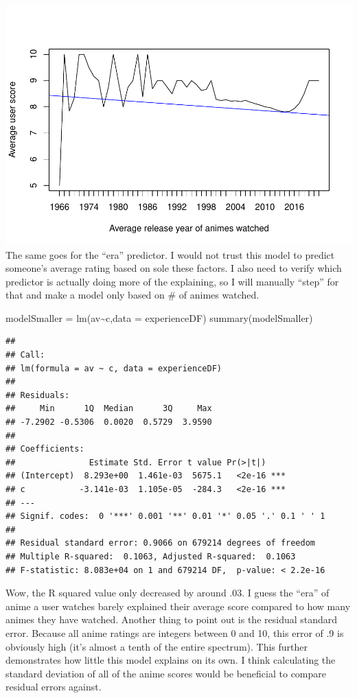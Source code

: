 \documentclass[
]{article}
\newenvironment{Shaded}{\begin{snugshade}}{\end{snugshade}}
\newcommand{\AttributeTok}[1]{\textcolor[rgb]{0.77,0.63,0.00}{#1}}
\newcommand{\FunctionTok}[1]{\textcolor[rgb]{0.00,0.00,0.00}{#1}}
\newcommand{\NormalTok}[1]{#1}
\newcommand{\OtherTok}[1]{\textcolor[rgb]{0.56,0.35,0.01}{#1}}
\newcommand{\SpecialCharTok}[1]{\textcolor[rgb]{0.00,0.00,0.00}{#1}}
\begin{document}
\includegraphics{R_analysis_files/figure-latex/unnamed-chunk-16-1.pdf}
The same goes for the ``era'' predictor. I would not trust this model to
predict someone's average rating based on sole these factors. I also
need to verify which predictor is actually doing more of the explaining,
so I will manually ``step'' for that and make a model only based on \#
of animes watched.

\begin{Shaded}
\begin{Highlighting}[]
\NormalTok{modelSmaller }\OtherTok{=} \FunctionTok{lm}\NormalTok{(av}\SpecialCharTok{\textasciitilde{}}\NormalTok{c,}\AttributeTok{data =}\NormalTok{ experienceDF)}
\FunctionTok{summary}\NormalTok{(modelSmaller)}
\end{Highlighting}
\end{Shaded}

\begin{verbatim}
## 
## Call:
## lm(formula = av ~ c, data = experienceDF)
## 
## Residuals:
##     Min      1Q  Median      3Q     Max 
## -7.2902 -0.5306  0.0020  0.5729  3.9590 
## 
## Coefficients:
##               Estimate Std. Error t value Pr(>|t|)    
## (Intercept)  8.293e+00  1.461e-03  5675.1   <2e-16 ***
## c           -3.141e-03  1.105e-05  -284.3   <2e-16 ***
## ---
## Signif. codes:  0 '***' 0.001 '**' 0.01 '*' 0.05 '.' 0.1 ' ' 1
## 
## Residual standard error: 0.9066 on 679214 degrees of freedom
## Multiple R-squared:  0.1063, Adjusted R-squared:  0.1063 
## F-statistic: 8.083e+04 on 1 and 679214 DF,  p-value: < 2.2e-16
\end{verbatim}

Wow, the R squared value only decreased by around .03. I guess the
``era'' of anime a user watches barely explained their average score
compared to how many animes they have watched. Another thing to point
out is the residual standard error. Because all anime ratings are
integers between 0 and 10, this error of .9 is obviously high (it's
almost a tenth of the entire spectrum). This further demonstrates how
little this model explains on its own. I think calculating the standard
deviation of all of the anime scores would be beneficial to compare
residual errors against.
\end{document}
